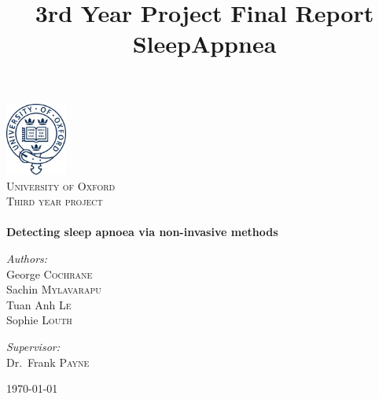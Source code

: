 \title{3rd Year Project Final Report \\ SleepAppnea}
\begin{titlepage}
\begin{center}

\includegraphics[width=0.15\textwidth]{drawings/oxford.png}~\\[1cm]

\textsc{\LARGE University of Oxford}\\[1.5cm]

\textsc{\Large Third year project}\\[0.5cm]

\HRule \\[0.4cm]
{\huge \bfseries Detecting sleep apnoea via non-invasive methods}
\HRule \\[1.5cm]

\begin{minipage}{0.4\textwidth}
\begin{flushleft} \large
\emph{Authors:}\\
George \textsc{Cochrane}\\
Sachin \textsc{Mylavarapu}\\
Tuan Anh \textsc{Le}\\
Sophie \textsc{Louth}
\end{flushleft}
\end{minipage}
\begin{minipage}{0.4\textwidth}
\begin{flushright} \large
\emph{Supervisor:} \\
Dr.~Frank \textsc{Payne}
\end{flushright}
\end{minipage}

\vfill

{\large \today}

\end{center}
\end{titlepage}